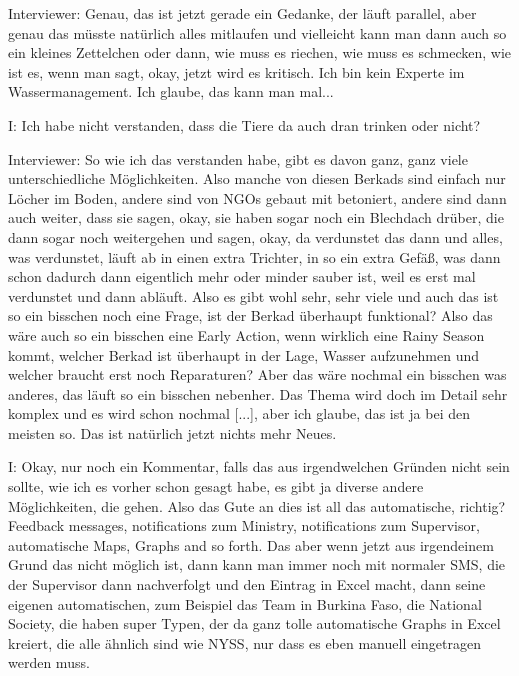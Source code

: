 Interviewer: Genau, das ist jetzt gerade ein Gedanke, der l{\"a}uft parallel, aber genau das m{\"u}sste nat{\"u}rlich alles mitlaufen und vielleicht kann man dann auch so ein kleines Zettelchen oder dann, wie muss es riechen, wie muss es schmecken, wie ist es, wenn man sagt, okay, jetzt wird es kritisch. Ich bin kein Experte im Wassermanagement. Ich glaube, das kann man mal... 

I: Ich habe nicht verstanden, dass die Tiere da auch dran trinken oder nicht? 

Interviewer: So wie ich das verstanden habe, gibt es davon ganz, ganz viele unterschiedliche M{\"o}glichkeiten. Also manche von diesen Berkads sind einfach nur L{\"o}cher im Boden, andere sind von NGOs gebaut mit betoniert, andere sind dann auch weiter, dass sie sagen, okay, sie haben sogar noch ein Blechdach dr{\"u}ber, die dann sogar noch weitergehen und sagen, okay, da verdunstet das dann und alles, was verdunstet, l{\"a}uft ab in einen extra Trichter, in so ein extra Gef{\"a}ß, was dann schon dadurch dann eigentlich mehr oder minder sauber ist, weil es erst mal verdunstet und dann abl{\"a}uft. Also es gibt wohl sehr, sehr viele und auch das ist so ein bisschen noch eine Frage, ist der Berkad {\"u}berhaupt funktional? Also das w{\"a}re auch so ein bisschen eine Early Action, wenn wirklich eine Rainy Season kommt, welcher Berkad ist {\"u}berhaupt in der Lage, Wasser aufzunehmen und welcher braucht erst noch Reparaturen? Aber das w{\"a}re nochmal ein bisschen was anderes, das l{\"a}uft so ein bisschen nebenher. Das Thema wird doch im Detail sehr komplex und es wird schon nochmal [...], aber ich glaube, das ist ja bei den meisten so. Das ist nat{\"u}rlich jetzt nichts mehr Neues. 

I: Okay, nur noch ein Kommentar, falls das aus irgendwelchen Gr{\"u}nden nicht sein sollte, wie ich es vorher schon gesagt habe, es gibt ja diverse andere M{\"o}glichkeiten, die gehen. Also das Gute an dies ist all das automatische, richtig? Feedback messages, notifications zum Ministry, notifications zum Supervisor, automatische Maps, Graphs and so forth. Das aber wenn jetzt aus irgendeinem Grund das nicht m{\"o}glich ist, dann kann man immer noch mit normaler SMS, die der Supervisor dann nachverfolgt und den Eintrag in Excel macht, dann seine eigenen automatischen, zum Beispiel das Team in Burkina Faso, die National Society, die haben super Typen, der da ganz tolle automatische Graphs in Excel kreiert, die alle {\"a}hnlich sind wie NYSS, nur dass es eben manuell eingetragen werden muss. 

